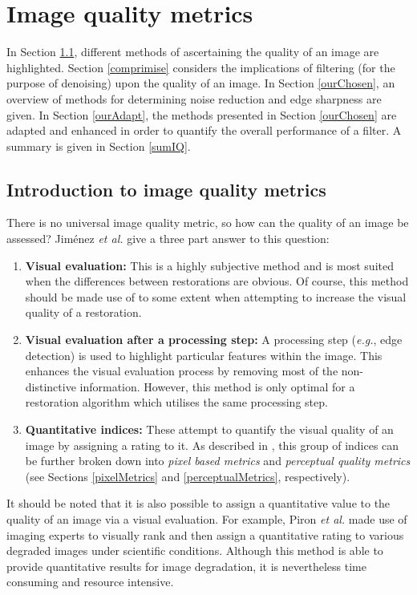 \documentclass[12pt]{report}
\begin{document}
			
\chapter{Image quality metrics}
\label{ch:IQ}
\label{sec:IQ}
In Section \ref{detIQ}, different methods of ascertaining the quality of an image are highlighted.
Section \ref{comprimise} considers the implications of filtering (for the purpose of denoising) 
upon the quality of an image.
In Section \ref{ourChosen}, an overview of methods for determining noise reduction and
edge sharpness are given. In Section \ref{ourAdapt}, the methods presented in
Section \ref{ourChosen} are adapted and enhanced in order to quantify the overall 
performance of a filter.
A summary is given in Section \ref{sumIQ}.


\section{Introduction to image quality metrics}
\label{detIQ}
There is no universal image quality metric, so
how can the quality of an image be assessed? Jim\'enez \emph{et al.} \cite{jim2001}
give a three part answer to this question:
\begin{enumerate}
	\item {\bf Visual evaluation:} This is a highly subjective method and is
		most suited when the differences between restorations are obvious.
		Of course, this method should be made use of to some extent when attempting 
		to increase the visual quality of a restoration.
	\item {\bf Visual evaluation after a processing step:} A processing step (\emph{e.g.}, edge
		detection) is used to highlight particular features within the image. This 
		enhances the visual evaluation process by removing most of the non-distinctive
		information. However, this method is only optimal for a restoration algorithm
		which utilises the same processing step.
	\item {\bf Quantitative indices:} These attempt to quantify the visual quality  
		of an image by assigning a rating to it.
		As described in \cite{petit99}, this group of indices can be further broken down into \emph{pixel
		based metrics} and \emph{perceptual quality metrics} (see Sections \ref{pixelMetrics} and 
		\ref{perceptualMetrics}, respectively).
\end{enumerate}	

It should be noted that it is also possible to assign a quantitative value to the quality of an image
via a visual evaluation. For example, Piron \emph{et al.} \cite{octalis} made use of imaging experts to
visually rank and then assign a quantitative rating to various degraded images under scientific conditions.
Although this method is able to provide quantitative results for image degradation, it is nevertheless
time consuming and resource intensive.
\end{document}
